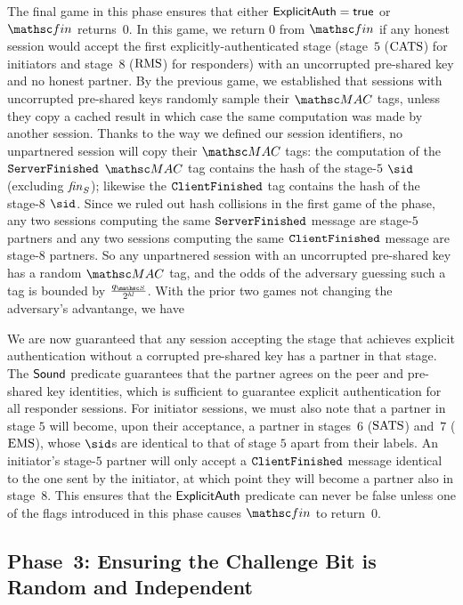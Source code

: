 The final game in this phase ensures that either $\mathsf{ExplicitAuth} = \mathsf{true}$ or $\Finalize$ returns~$0$.
In this game, we return $0$ from $\Finalize$ if any honest session would accept the first explicitly-authenticated stage (stage~$5$ ($\mathrm{CATS}$) for initiators and stage~$8$ ($\mathrm{RMS}$) for responders) with an uncorrupted pre-shared key and no honest partner.
By the previous game, we established that sessions with uncorrupted pre-shared keys randomly sample their $\MAC$ tags,
unless they copy a cached result in which case the same computation was made by another session.
Thanks to the way we defined our session identifiers, no unpartnered session will copy their $\MAC$ tags:
the computation of the $\mathtt{ServerFinished}$ $\MAC$ tag contains the hash of the stage-$5$ $\sid$ (excluding $\mathit{fin}_S$); likewise the $\mathtt{ClientFinished}$ tag contains the hash of the stage-$8$ $\sid$.
Since we ruled out hash collisions in the first game of the phase, any two sessions computing the same $\mathtt{ServerFinished}$ message are stage-$5$ partners and any two sessions computing the same $\mathtt{ClientFinished}$ message are stage-$8$ partners.
So any unpartnered session with an uncorrupted pre-shared key has a random $\MAC$ tag, and the odds of the adversary guessing such a tag is bounded by $\frac{\qSend}{2^{\hashlen}}$.
With the prior two games not changing the adversary's advantange, we have

We are now guaranteed that any session accepting the stage that achieves explicit authentication without a corrupted pre-shared key has a partner in that stage.
The $\mathsf{Sound}$ predicate guarantees that the partner agrees on the peer and pre-shared key identities, which is sufficient to guarantee explicit authentication for all responder sessions.
For initiator sessions, we must also note that a partner in stage $5$ will become, upon their acceptance, a partner in stages~$6$ ($\mathrm{SATS}$) and~$7$ ($\mathrm{EMS}$), whose $\sid$s are identical to that of stage $5$ apart from their labels.
An initiator's stage-$5$ partner will only accept a $\mathtt{ClientFinished}$ message identical to the one sent by the initiator, at which point they will become a partner also in stage~$8$.
This ensures that the $\mathsf{ExplicitAuth}$ predicate can never be false unless one of the flags introduced in this phase causes $\Finalize$ to return~$0$.


\subsection*{Phase~3: Ensuring the Challenge Bit is Random and Independent}


